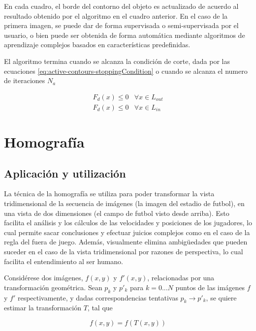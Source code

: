 \documentclass[a4paper,10pt]{article}
\begin{document}
En cada cuadro, el borde del contorno del objeto es actualizado de acuerdo al
resultado obtenido por el algoritmo en el cuadro anterior. En el caso de la
primera imagen, se puede dar de forma supervisada o semi-supervisada por el
usuario, o bien puede ser obtenida de forma automática mediante algoritmos de
aprendizaje complejos basados en características predefinidas.

El algoritmo termina cuando se alcanza la condición de corte, dada por las
ecuaciones \ref{eq:active-contours-stoppingCondition} o cuando se alcanza el numero de iteraciones $N_a$

\begin{equation}
\label{eq:active-contours-stoppingCondition}
    \begin{array}{ll}
        F_{d}(x) \leq 0 & \forall x \in L_{out}\\
        F_{d}(x) \leq 0 & \forall x \in L_{in}
    \end{array}
\end{equation}


\section{Homografía}
\label{sec:homography}

\subsection{Aplicación y utilización}

La técnica de la homografía se utiliza para poder transformar la vista
tridimensional de la secuencia de imágenes (la imagen del estadio de futbol), en
una vista de dos dimensiones (el campo de futbol visto desde arriba). Esto
facilita el análisis y los cálculos de las velocidades y posiciones de los
jugadores, lo cual permite sacar conclusiones y efectuar juicios complejos como
en el caso de la regla del fuera de juego. Además, visualmente elimina
ambigüedades que pueden suceder en el caso de la vista tridimensional por
razones de perspectiva, lo cual facilita el entendimiento al ser humano.

Considérese dos imágenes, $f(x,y)$ y $f'(x,y)$, relacionadas por una transformación geométrica. Sean $p_{k}$ y $p'_{k}$ para $k = 0 ... N$ puntos de las imágenes
$f$ y $f'$ respectivamente, y dadas correspondencias tentativas $p_{k} \to p'_{k}$, se quiere estimar la transformación $T$, tal que

\begin{equation}
    f(x,y) = f(T(x,y))
\end{equation}
\end{document}

